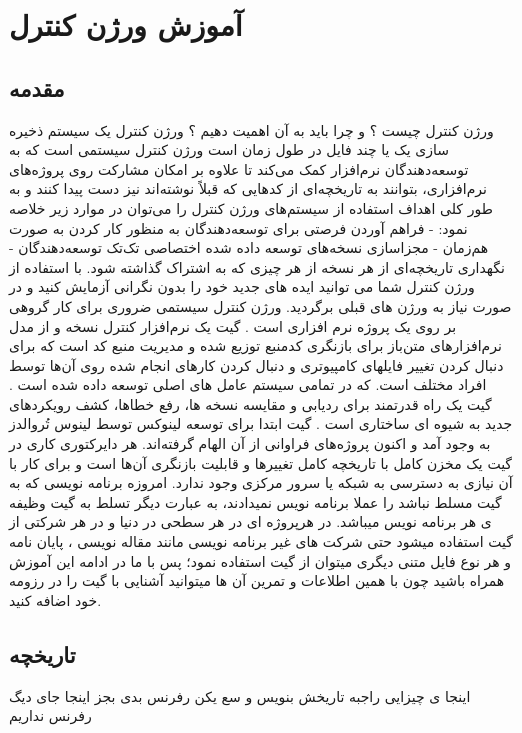 \chapter{آموزش ورژن کنترل}




\section{مقدمه}
ورژن کنترل چیست ؟ و چرا باید به آن اهمیت دهیم ؟ ورژن کنترل یک سیستم ذخیره سازی یک یا چند فایل در طول زمان است \cite{Blischak2016} ورژن کنترل سیستمی است که به توسعه‌دهندگان نرم‌افزار کمک می‌کند تا علاوه بر امکان مشارکت روی پروژه‌های نرم‌افزاری، بتوانند به تاریخچه‌ای از کدهایی که قبلاً نوشته‌اند نیز دست پیدا کنند و به طور کلی اهداف استفاده از سیستم‌های ورژن کنترل را می‌توان در موارد زیر خلاصه نمود:
- فراهم آوردن فرصتی برای توسعه‌دهندگان به منظور کار کردن به صورت هم‌زمان 
- مجزاسازی نسخه‌های توسعه داده شده اختصاصی تک‌تک توسعه‌دهندگان 
- نگهداری تاریخچه‌ای از هر نسخه از هر چیزی که به اشتراک گذاشته شود.
با استفاده از ورژن کنترل شما می توانید ایده های جدید خود را بدون نگرانی آزمایش کنید و در صورت نیاز به ورژن های قبلی برگردید\cite{Chacon2014}. ورژن کنترل سیستمی ضروری برای کار گروهی بر روی یک پروژه نرم افزاری است \cite{DeAlwis2009} . 
گیت یک نرم‌افزار کنترل نسخه و از مدل نرم‌افزارهای متن‌باز برای بازنگری کدمنبع توزیع شده و مدیریت منبع کد است که برای دنبال کردن تغییر فایلهای کامپیوتری و دنبال کردن کارهای انجام شده روی آن‌ها توسط افراد مختلف است. که در تمامی سیستم عامل های اصلی توسعه داده شده است \cite{Ram2013} . گیت یک راه قدرتمند برای ردیابی و مقایسه نسخه ها، رفع خطاها، کشف رویکردهای جدید به شیوه ای ساختاری است\cite{spinellis2012git} .
گیت ابتدا برای توسعه لینوکس توسط لینوس تُروالدز به وجود آمد و اکنون پروژه‌های فراوانی از آن الهام گرفته‌اند. هر دایرکتوری کاری در گیت یک مخزن کامل با تاریخچه کامل تغییرها و قابلیت بازنگری آن‌ها است و برای کار با آن نیازی به دسترسی به شبکه یا سرور مرکزی وجود ندارد.
امروزه برنامه نویسی که به گیت مسلط نباشد را عملا برنامه نویس نمیدادند، به عبارت دیگر تسلط به گیت وظیفه ی هر برنامه نویس میباشد. در هرپروژه ای در هر سطحی در دنیا و در هر شرکتی از گیت استفاده میشود حتی شرکت های غیر برنامه نویسی مانند مقاله نویسی ، پایان نامه و هر نوع فایل متنی دیگری میتوان از گیت استفاده نمود؛ پس با ما در ادامه این آموزش همراه باشید چون با همین اطلاعات و تمرین آن ها میتوانید آشنایی با گیت را در رزومه خود اضافه کنید.

\section{تاریخچه}
اینجا ی چیزایی راجبه تاریخش بنویس و سع یکن رفرنس بدی بجز اینجا جای دیگ رفرنس نداریم 
